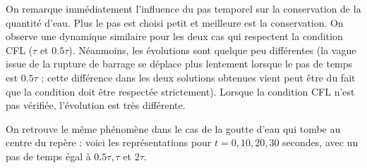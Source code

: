 \documentclass[
11pt, %
francais, %
singlespacing, %
headsepline, %
]{MastersDoctoralThesis} %
\begin{document}
On remarque immédiatement l'influence du pas temporel sur la conservation de la quantité d'eau. Plus le pas est choisi petit et meilleure est la conservation. On observe une dynamique similaire pour les deux cas qui respectent la condition CFL ($\tau$ et $0.5\tau$). Néanmoins, les évolutions sont quelque peu différentes (la vague issue de la rupture de barrage se déplace plus lentement lorsque le pas de temps est $0.5\tau$ ; cette différence dans les deux solutions obtenues vient peut être du fait que la condition doit être respectée strictement). Lorsque la condition CFL n'est pas vérifiée, l'évolution est très différente.


On retrouve le même phénomène dans le cas de la goutte d'eau qui tombe au centre du repère : voici les représentations pour $t=0, 10, 20, 30$ secondes, avec un pas de temps égal à $0.5\tau, \tau$ et $2\tau$.
\end{document}
